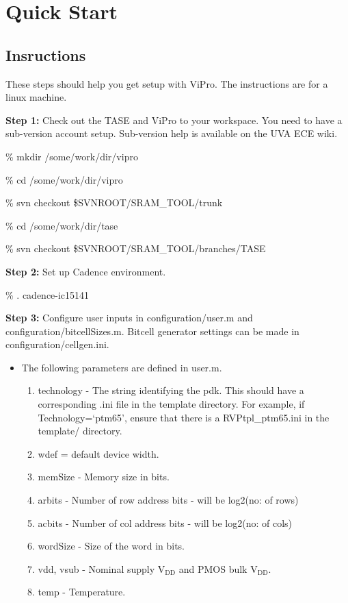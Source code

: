 \section{Quick Start}

\subsection{Insructions}
These steps should help you get setup with ViPro. The instructions are for a linux machine.
\begin{description}
\item \textbf{Step 1:} Check out the TASE and ViPro to your workspace. You need to have a sub-version account setup. Sub-version help is available on the UVA ECE wiki.

\% mkdir /some/work/dir/vipro

\% cd /some/work/dir/vipro

\% svn checkout \$SVNROOT/SRAM\_TOOL/trunk

\% cd /some/work/dir/tase

\% svn checkout \$SVNROOT/SRAM\_TOOL/branches/TASE

\item \textbf{Step 2:} Set up Cadence environment.

\% . cadence-ic15141

\item \textbf{Step 3:} Configure user inputs in configuration/user.m and configuration/bitcellSizes.m. Bitcell generator settings can be made in configuration/cellgen.ini.

\begin{itemize}

\item The following parameters are defined in user.m.
\begin{enumerate}
\item technology - The string identifying the pdk. This should have a corresponding .ini file in the template directory. For example, if Technology=`ptm65', ensure that there is a RVPtpl\_ptm65.ini in the template/ directory.
\item wdef = default device width.
\item memSize - Memory size in bits.
\item arbits - Number of row address bits - will be log2(no: of rows)
\item acbits - Number of col address bits - will be log2(no: of cols)
\item wordSize - Size of the word in bits.
\item vdd, vsub - Nominal supply V$_\text{DD}$ and PMOS bulk V$_\text{DD}$.
\item temp - Temperature.


\end{enumerate}
\end{itemize}
\end{description}
